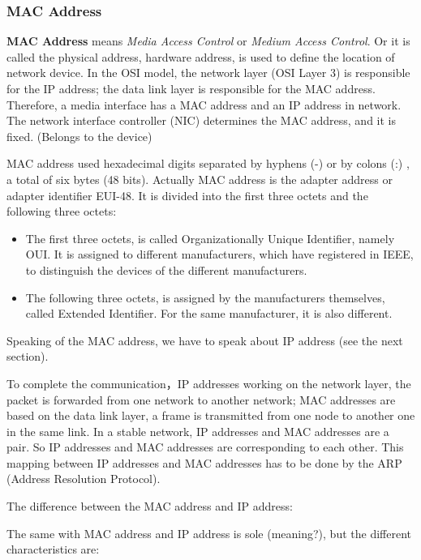 \subsubsection{MAC Address}

\textbf{MAC Address} means \textit{Media Access Control} or \textit{Medium Access Control}. Or it is called the physical address, hardware address, is used to define the location of network device. In the OSI model, the network layer (OSI Layer 3) is responsible for the IP address; the data link layer is responsible for the MAC address. Therefore, a media interface has a MAC address and an IP address in network. The network interface controller (NIC) determines the MAC address, and it is fixed. (Belongs to the device)  

MAC address used hexadecimal digits separated by hyphens (-) or by colons (:) , a total of six bytes (48 bits). Actually MAC address is the adapter address or adapter identifier EUI-48. It is divided into the first three octets and the following three octets:  

\begin{itemize}
	\item The first three octets, is called Organizationally Unique Identifier, namely OUI. It is assigned to different manufacturers, which have registered in IEEE, to distinguish the devices of the different manufacturers.
	\item The following three octets, is assigned by the manufacturers themselves, called Extended Identifier. For the same manufacturer, it is also different.
\end{itemize}


Speaking of the MAC address, we have to speak about IP address (see the next section).

To complete the communication，IP addresses working on the network layer, the packet is forwarded from one network to another network; MAC addresses are based on the data link layer, a frame is transmitted from one node to another one in the same link. In a stable network, IP addresses and MAC addresses are a pair. So IP addresses and MAC addresses are corresponding to each other. This mapping between IP addresses and MAC addresses has to be done by the ARP (Address Resolution Protocol).  

The difference between the MAC address and IP address:  

The same with MAC address and IP address is sole (meaning?), but the different characteristics are:  

